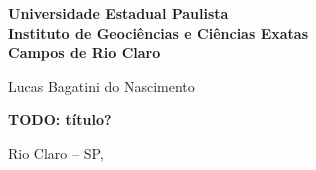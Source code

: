 \documentclass[12pt,a4paper]{article}
\begin{document}
\pagestyle{fancy}
\fancyhf{} %
\renewcommand{\headrulewidth}{0.8pt}
\renewcommand{\sectionmark}[1]{\markright{\bfseries \thesection\ #1}}
\renewcommand{\subsectionmark}[1]{\markright{\bfseries \thesubsection\ #1}}
\fancyhead[LH]{\nouppercase{\rightmark}}
\fancyhead[RH]{{\bfseries \thepage}}

\thispagestyle{empty}
\begin{titlepage}

	\begin{center}
		 {\large \textbf{\textsf{Universidade Estadual Paulista}}}\\
		 {\large \textbf{\textsf{Instituto de Geociências e Ciências Exatas}}}\\
		 {\large \textbf{\textsf{Campos de Rio Claro}}}

		\vspace{4cm}

		{\Large \textsf{Lucas Bagatini do Nascimento}}

		\vspace{4cm}

		{\LARGE \textbf{\textsf{TODO: título?}}}

		\vfill

		Rio Claro -- SP,\\
		\the\year
	\end{center}


\end{titlepage}
\end{document}
